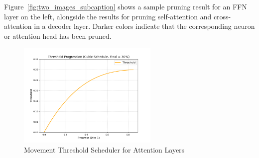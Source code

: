 \documentclass{article}
\begin{document}
    \hspace*{1em} Figure~\ref{fig:two_images_subcaption} shows a sample pruning result for an FFN layer on the left, alongside the results for pruning self-attention and cross-attention in a decoder layer. Darker colors indicate that the corresponding neuron or attention head has been pruned.

    \begin{figure}[hbpt]
        \centering
        \includegraphics[width=0.6\textwidth]{pics/pa/1}
        \caption{Movement Threshold Scheduler for Attention Layers}
        \label{fig:sub3}
    \end{figure}
\end{document}
